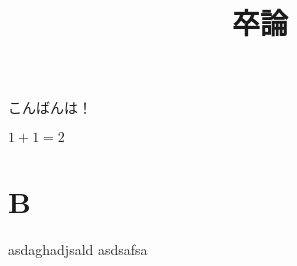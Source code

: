\documentclass{jsarticle}
\title{卒論}
\theoremstyle{definition}
\begin{document}
\maketitle
こんばんは！

$1 + 1 = 2$


\section{B}
asdaghadjsald
asdsafsa
\end{document}
